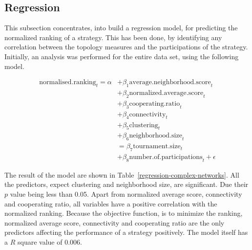 \subsection{Regression}
This subsection concentrates, into build a regression model, for predicting
the normalized ranking of a strategy. This has been done, by identifying any
correlation between the topology measures and the participations of the strategy.
Initially, an analysis was performed for the entire data set, using the following
model.

\begin{align}
	\mathrm{normalised.ranking}_{t} = \alpha
	  & + \beta_{1}  \mathrm{average.neighborhood.score}_{t}          \\
	  & + \beta_{2}  \mathrm{normalized.average.score}_{t}            \\
	  & + \beta_{3}  \mathrm{cooperating.ratio}_{t}                   \\
	  & + \beta_{4}  \mathrm{connectivity}_{t}                        \\
	  & + \beta_{5}  \mathrm{clustering}_{t}                          \\
	  & + \beta_{6}  \mathrm{neighborhood.size}_{t}                   \\
	  & = \beta_{7}  \mathrm{tournament.size}_{t}                     \\
	  & + \beta_{8}  \mathrm{number.of.participations}_{t} + \epsilon
\end{align}

The result of the model are shown in Table~\ref{regression-complex-networks}.
All the predictors, expect clustering and neighborhood size, are significant.
Due their \(p\) value being less than 0.05.
Apart from normalized average score, connectivity and cooperating ratio, all
variables have a positive correlation with the normalized ranking. Because the
objective function, is to minimize the ranking, normalized average score,
connectivity and cooperating ratio are the only predictors affecting the performance
of a strategy positively. The model itself has a \(R\) square value of 0.006.

